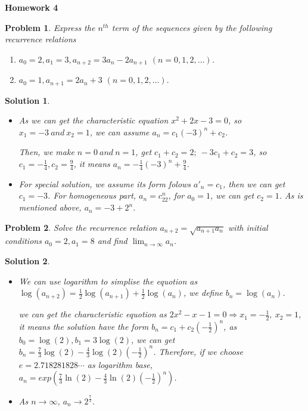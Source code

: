 \documentclass[12pt]{article}
\date{Feb 14, 2012}
\newtheorem*{solution}{Solution}
\newtheorem{hw}{Problem}
\begin{document}
\begin{center}
{\LARGE\bf Homework 4}\\
\vspace{2mm}
\end{center}






\begin{hw}
Express the $n^{th}$ term of the sequences given by the following recurrence relations

\begin{enumerate}
 \item $a_0=2, a_1=3, a_{n+2}=3a_n - 2a_{n+1} $ $(n=0,1,2,\ldots)$.
 \item $a_0=1, a_{n+1}=2a_n+3$ $(n=0,1,2,\ldots).$
\end{enumerate}
\end{hw}

\begin{solution}\item
    \begin{itemize}
      \item [(1)] As we can get the characteristic equation $x^2+2x-3=0$, so $x_1=-3\ and\ x_2=1$, we can assume $a_n=c_1(-3)^n+c_2$.\par
      Then, we make $n=0\ and\ n=1$, get $c_1+c_2=2;\ -3c_1+c_2=3$, so $c_1=-\frac{1}{4},c_2=\frac{9}{4}$, it means $a_n = -\frac{1}{4}(-3)^n+\frac{9}{4}$.
      \item [(2)] For special solution, we assume its form folows $a'_n=c_1$, then we can get $c_1=-3$. For homogeneous part, $a_n=c_22^n$, for $a_0=1$, we can get $c_2 = 1$. As is mentioned above, $a_n=-3+2^n$.
    \end{itemize}
\end{solution}

\begin{hw}
Solve the recurrence relation $a_{n+2}=\sqrt{a_{n+1}a_n}$ with initial conditions $a_0=2, a_1=8$ and find $\lim_{n\rightarrow \infty}a_n $.
\end{hw}

\begin{solution}\item
    \begin{itemize}
      \item [(1)] We can use logarithm to simplise the equotion as $\log(a_{n+2})=\frac{1}{2}\log(a_{n+1})+\frac{1}{2}\log(a_{n})$, we define $b_n=\log(a_n)$.\par
      we can get the characteristic equotion as $2x^2-x-1=0 \Rightarrow x_1=-\frac{1}{2},\ x_2=1$, it means the solution have the form $b_n=c_1+c_2(-\frac{1}{2})^n$, as $b_0=\log(2),b_1=3\log(2)$, we can get $b_n=\frac{7}{3}\log(2)-\frac{4}{3}\log(2)(-\frac{1}{2})^n$. Therefore, if we choose $e=2.718281828\cdots$ as logarithm base, $a_n=exp(\frac{7}{3}\ln(2)-\frac{4}{3}\ln(2)(-\frac{1}{2})^n)$.
      \item [(2)] As $n \rightarrow \infty$, $a_n \rightarrow 2^{\frac{7}{3}}$.
    \end{itemize}
\end{solution}
\end{document}
